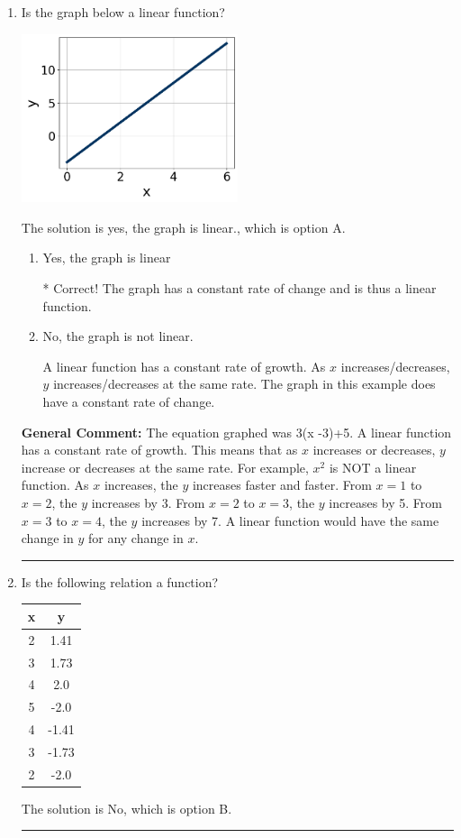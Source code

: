 \documentclass{extbook}[14pt]
\newcommand{\litem}[1]{\item #1

\rule{\textwidth}{0.4pt}}
\begin{document}
\begin{enumerate}\litem{
Is the graph below a linear function?

\begin{center}
    \includegraphics[width=0.5\textwidth]{../Figures/MA_8_F_1_2_graphI.png}
\end{center}


The solution is yes, the graph is linear., which is option A.

\begin{enumerate}[label=\Alph*.]
\item Yes, the graph is linear

* Correct! The graph has a constant rate of change and is thus a linear function.
\item No, the graph is not linear.

A linear function has a constant rate of growth. As $x$ increases/decreases, $y$ increases/decreases at the same rate. The graph in this example does have a constant rate of change.
\end{enumerate}


\textbf{General Comment:} The equation graphed was 3(x -3)+5. A linear function has a constant rate of growth. This means that as $x$ increases or decreases, $y$ increase or decreases at the same rate. For example, $x^2$ is NOT a linear function. As $x$ increases, the $y$ increases faster and faster. From $x=1$ to $x=2$, the $y$ increases by 3. From $x=2$ to $x=3$, the $y$ increases by 5. From $x=3$ to $x=4$, the $y$ increases by 7. A linear function would have the same change in $y$ for any change in $x$.
}
\litem{
Is the following relation a function?


\begin{tabular}{c|c}
x &y\tabularnewline \hline
2 &1.41\tabularnewline \hline
3 &1.73\tabularnewline \hline
4 &2.0\tabularnewline \hline
5 &-2.0\tabularnewline \hline
4 &-1.41\tabularnewline \hline
3 &-1.73\tabularnewline \hline
2 &-2.0\end{tabular}The solution is No, which is option B.

}
\end{enumerate}
\end{document}
